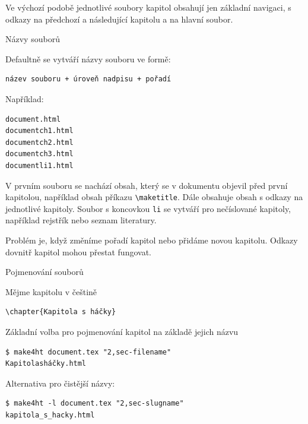 Ve výchozí podobě jednotlivé soubory kapitol obsahují jen základní navigaci,
s odkazy na předchozí a následující kapitolu a na hlavní soubor.

\begin{frame}[fragile]{Názvy souborů}
\begin{block}{Defaultně se vytváří názvy souboru ve formě:}
\begin{verbatim}
název souboru + úroveň nadpisu + pořadí
\end{verbatim}
\end{block}

\begin{block}{Například:}
\begin{verbatim}
document.html
documentch1.html
documentch2.html
documentch3.html
documentli1.html
\end{verbatim}
\end{block}
\end{frame}

V prvním souboru se nachází obsah, který se v dokumentu objevil před první kapitolou, například obsah příkazu 
\verb|\maketitle|. Dále obsahuje obsah s odkazy na jednotlivé kapitoly. Soubor s koncovkou \verb|li| se vytváří 
pro nečíslované kapitoly, například rejstřík nebo seznam literatury.

Problém je, když změníme pořadí kapitol nebo přidáme novou kapitolu. Odkazy dovnitř kapitol mohou přestat fungovat.

\begin{frame}[fragile]{Pojmenování souborů}
  \begin{block}{Mějme kapitolu v češtině}
    \begin{verbatim}
\chapter{Kapitola s háčky}
    \end{verbatim}
  \end{block}

  \begin{block}{Základní volba pro pojmenování kapitol na základě jejich názvu}
  \begin{verbatim}
$ make4ht document.tex "2,sec-filename"
Kapitolasháčky.html
    \end{verbatim}
  \end{block}
\begin{block}{Alternativa pro čistější názvy:}
\begin{verbatim}
$ make4ht -l document.tex "2,sec-slugname"
kapitola_s_hacky.html
\end{verbatim}
\end{block}

\end{frame}

